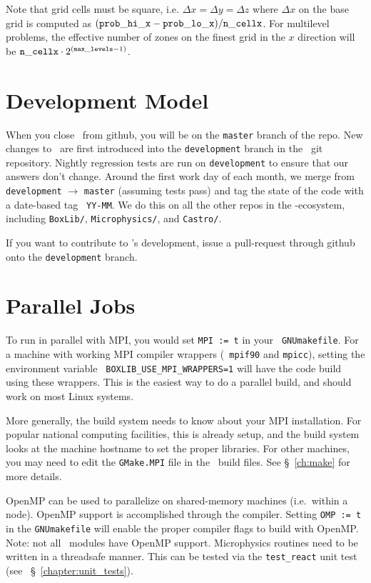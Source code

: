 Note that grid cells must be square, i.e. $\Delta x = \Delta y = \Delta z$
where $\Delta x$ on the base grid is computed as $({\tt prob\_hi\_x}
- {\tt prob\_lo\_x})/{\tt n\_cellx}$.  For multilevel problems, the effective
number of zones on the finest grid in the $x$ direction will be
${\tt n\_cellx} \cdot 2^{({\tt max\_levels} -1)}$.


\section{Development Model}

When you close \maestro\ from github, you will be on the {\tt master}
branch of the repo.  New changes to \maestro\ are first introduced
into the {\tt development} branch in the \maestro\ git repository.
Nightly regression tests are run on {\tt development} to ensure that
our answers don't change.  Around the first work day of each month, we
merge from {\tt development} $\rightarrow$ {\tt master} (assuming
tests pass) and tag the state of the code with a date-based tag {\tt
  YY-MM}.  We do this on all the other repos in the \boxlib-ecosystem,
including {\tt BoxLib/}, {\tt Microphysics/}, and {\tt Castro/}.  

If you want to contribute to \maestro's development, issue a pull-request
through github onto the {\tt development} branch.


\section{Parallel Jobs}

To run in parallel with MPI, you would set {\tt MPI := t} in your {\tt
GNUmakefile}.  For a machine with working MPI compiler wrappers ({\tt
mpif90} and {\tt mpicc}), setting the environment variable {\tt
BOXLIB\_USE\_MPI\_WRAPPERS=1} will have the code build using these
wrappers.  This is the easiest way to do a parallel build, and should
work on most Linux systems.

More generally, the build system needs to know about your MPI
installation.  For popular national computing facilities, this is
already setup, and the build system looks at the machine hostname to
set the proper libraries.  For other machines, you may need to edit
the {\tt GMake.MPI} file in the \boxlib\ build files.  See
\S~\ref{ch:make} for more details.

OpenMP can be used to parallelize on shared-memory machines (i.e.\
within a node).  OpenMP support is accomplished through the compiler.
Setting {\tt OMP := t} in the {\tt GNUmakefile} will enable the proper
compiler flags to build with OpenMP.  Note: not all \maestro\ modules 
have OpenMP support.  Microphysics routines need to be written in a
threadsafe manner.  This can be tested via the {\tt test\_react} unit
test (see ~\S~\ref{chapter:unit_tests}).

